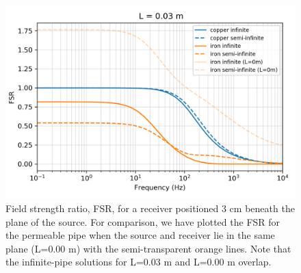 \begin{figure}
    \begin{center}
    \includegraphics[width=0.6\columnwidth]{figures/casing_software/Augustin3cm.png}
    \end{center}
\caption{
    Field strength ratio, FSR, for a receiver positioned 3 cm beneath
    the plane of the source. For comparison, we have plotted the
    FSR for the permeable pipe when the source and receiver lie in the same
    plane (L=0.00 m) with the semi-transparent orange lines.
    Note that the infinite-pipe solutions for L=0.03 m and L=0.00 m overlap.
}
\label{fig:Augustin3cm}
\end{figure}
